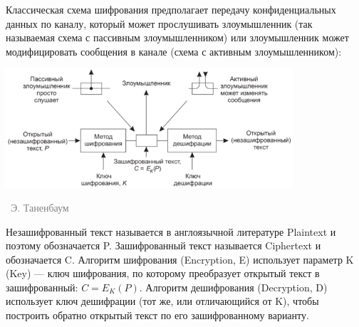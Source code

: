 \documentclass[a5paper]{article}
\newcommand{\attribution}[1] {
\vspace{-5mm}\begin{flushright}\begin{scriptsize}\textcolor{gray}{\textcopyright\, #1}\end{scriptsize}\end{flushright}
}
\begin{document}
Классическая схема шифрования предполагает передачу конфиденциальных данных по каналу, который может прослушивать злоумышленник (так называемая схема с пассивным злоумышленником) или злоумышленник может модифицировать сообщения в канале (схема с активным злоумышленником):

\begin{center}
    \includegraphics[width=0.8\textwidth]{cryptography.png}
    \attribution{Э. Таненбаум}
\end{center}

Незашифрованный текст называется в англоязычной литературе Plaintext и поэтому обозначается P. Зашифрованный текст называется Ciphertext и обозначается C. Алгоритм шифрования (Encryption, E) использует параметр K (Key) --- ключ шифрования, по которому преобразует открытый текст в зашифрованный: $C = E_K(P)$. Алгоритм дешифрования (Decryption, D) использует ключ дешифрации (тот же, или отличающийся от K), чтобы построить обратно открытый текст по его зашифрованному варианту.
\end{document}
